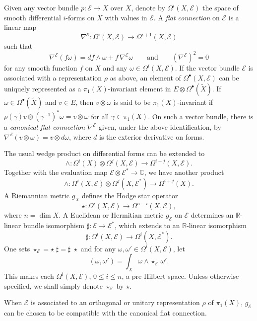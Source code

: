 \documentclass[12pt]{amsart}
\theoremstyle{plain}
\theoremstyle{definition}
\theoremstyle{remark}
\begin{document}
Given any vector bundle $p\colon{\mathcal E}\to X$ over $X$, denote by $\Omega^i(X,{\mathcal E})$
the space of smooth differential $i$-forms on $X$ with values in ${\mathcal E}$. 
A {\it flat connection} on ${\mathcal E}$ is a linear map
$$
\nabla^{\mathcal E}\colon\Omega^i(X,{\mathcal E})\to\Omega^{i+1}(X,{\mathcal E})
$$
such that 
$$
\nabla^{\mathcal E}(f\omega)=df\wedge\omega+f\,\nabla^{\mathcal E}\omega 
\qquad\text{and}\qquad(\nabla^{\mathcal E})^2=0 
$$
for any smooth function $f$ on $X$ and any $\omega\in\Omega^i(X,{\mathcal E})$.
If the vector bundle ${\mathcal E}$ is associated with a representation $\rho$
as {{above}}, an element of $\Omega^\bullet(X,{\mathcal E})$
can be uniquely represented as a $\pi_1(X)$-invariant element in 
$E\otimes\Omega^\bullet(\widetilde X)$.
If $\omega\in\Omega^\bullet(\widetilde X)$ and $v\in E$,
then $v\otimes\omega$ is said to be $\pi_1(X)$-invariant
if $\rho(\gamma)v\otimes (\gamma^{{{-1}}})^*\omega=v\otimes\omega$
for all $\gamma\in\pi_1(X)$.
On such a vector bundle, there is a {\it canonical flat connection}
$\nabla^{\mathcal E}$ given, under the above identification, by
$\nabla^{\mathcal E}(v\otimes\omega)=v\otimes d\omega$, 
where $d$ is the exterior derivative on forms.

The usual wedge product on differential forms can be extended to
$$
\wedge\colon\Omega^i(X)\otimes\Omega^{j}(X,{\mathcal E})\to\Omega^{i+j}(X,{\mathcal E}).
$$
Together with the evaluation map ${\mathcal E}\otimes{\mathcal E}^*\to{\mathbb{C}}$, we have another product
$$
\wedge\colon\Omega^i(X,{\mathcal E})\otimes\Omega^{j}(X,{\mathcal E}^*)\to\Omega^{i+j}(X).
$$
A Riemannian metric $g_X$ defines the Hodge star operator 
$$
\star \colon\Omega^i(X,{\mathcal E})\to\Omega^{n-i}(X,{\mathcal E}),
$$
where $n=\dim X$.
A Euclidean or Hermitian metric $g_{\mathcal E}$ on ${\mathcal E}$ determines an ${\mathbb{R}}$-linear
bundle isomorphism $\sharp\colon{\mathcal E}\to{\mathcal E}^*$, which extends to an ${\mathbb{R}}$-linear
isomorphism 
$$
\sharp\colon\Omega^i(X,{\mathcal E})\to\Omega^i(X,{\mathcal E}^*).
$$
One sets $\star_{\mathcal E}=\star\;\sharp=\sharp\;\star$ and for any 
$\omega,\omega'\in\Omega^i(X,{\mathcal E})$, let
$$
(\omega,\omega')=\int_X\omega\wedge{{\star_{\mathcal E}}}\,\omega'.
$$
This makes each $\Omega^i(X,{\mathcal E})$, $0\le i\le n$, a pre-Hilbert space. {{Unless otherwise specified, we shall simply denote $\star_{\mathcal E}$ by $\star$}}. 

When ${\mathcal E}$ is associated to an orthogonal or unitary representation $\rho$
of $\pi_1(X)$, $g_{\mathcal E}$ can be chosen to be compatible with the canonical
flat connection. 
\end{document}
